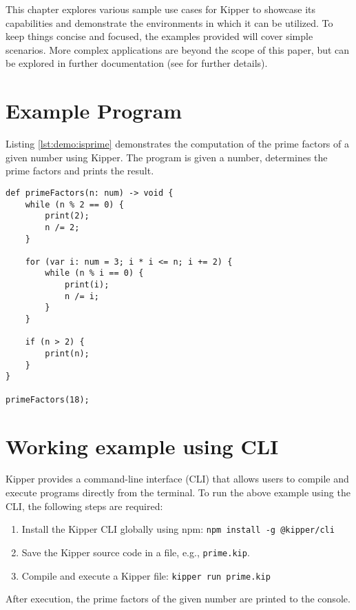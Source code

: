 This chapter explores various sample use cases for Kipper to showcase its capabilities and demonstrate the environments in which it can be utilized. To keep things concise and focused, the examples provided will cover simple scenarios. More complex applications are beyond the scope of this paper, but can be explored in further documentation (see  for further details).

\section{Example Program}

Listing \ref{lst:demo:isprime} demonstrates the computation of the prime factors of a given number using Kipper. The program is given a number, determines the prime factors and prints the result.

\begin{lstlisting}[language=Kipper,caption=A basic programs that determines the prime factors of an integer, label=lst:demo:isprime]
def primeFactors(n: num) -> void {
	while (n % 2 == 0) {
		print(2);
		n /= 2;
	}
	
	for (var i: num = 3; i * i <= n; i += 2) {
		while (n % i == 0) {
			print(i);
			n /= i;
		}
	}
	
	if (n > 2) {
		print(n);
	}
}

primeFactors(18);
\end{lstlisting}

\section{Working example using CLI}

Kipper provides a command-line interface (CLI) that allows users to compile and execute programs directly from the terminal. To run the above example using the CLI, the following steps are required:

\begin{enumerate}
	\item Install the Kipper CLI globally using npm: \lstinline|npm install -g @kipper/cli|
	\item Save the Kipper source code in a file, e.g., \texttt{prime.kip}.
	\item Compile and execute a Kipper file: \lstinline|kipper run prime.kip|
\end{enumerate}

After execution, the prime factors of the given number are printed to the console.

